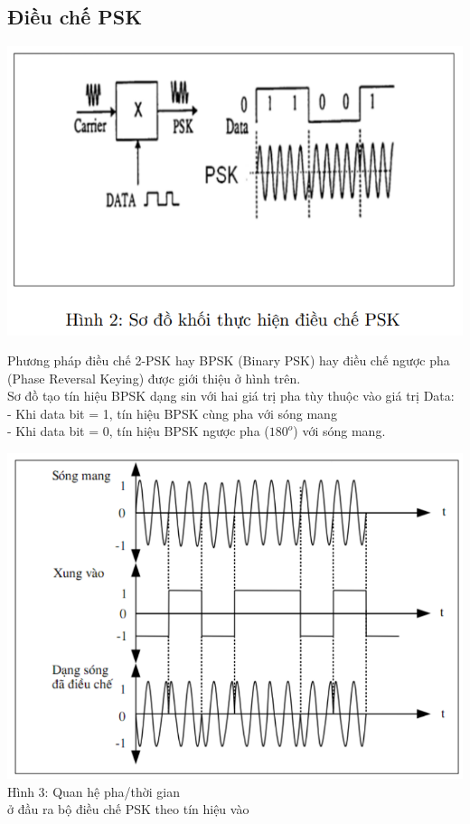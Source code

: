 \subsection{Điều chế PSK}
\begin{center}
     \includegraphics[scale=.7]{Img/sododieuchePSK.png}
\end{center}
Phương pháp điều chế 2-PSK hay BPSK (Binary PSK) hay điều chế ngược pha (Phase
Reversal Keying) được giới thiệu ở hình trên. \\ Sơ đồ tạo tín hiệu BPSK dạng sin với hai giá trị pha tùy thuộc vào giá trị Data: \\ 
- Khi data bit = 1, tín hiệu BPSK cùng pha với sóng mang \\ 
- Khi data bit = 0, tín hiệu BPSK ngược pha ($180^{o}$) với sóng mang. \\ 
\begin{center}
     \includegraphics[scale=.5]{Img/quanhethoigiandieuche.png} \\ 
     Hình 3: Quan hệ pha/thời gian \\  ở đầu ra bộ điều chế PSK theo tín hiệu vào
\end{center}  \\
